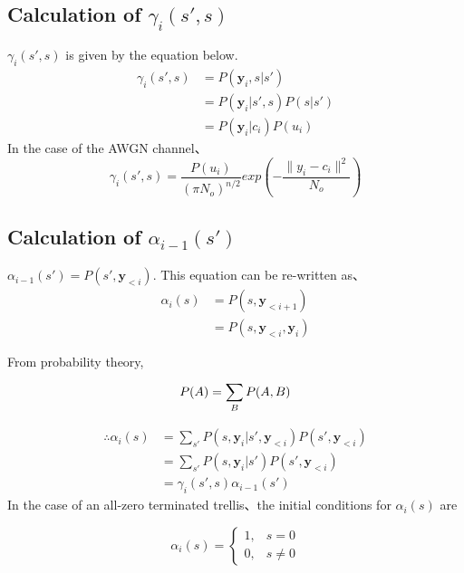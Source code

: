 \documentclass[20 pts]{article}
\begin{document}
\subsection{Calculation of $\gamma_i(s',s)$}
$\gamma_i(s',s)$ is given by the equation below.
\begin{equation}
\begin{split}
\gamma_i(s',s)&=P(\boldsymbol{y}_{i},s|s')\\
&=P(\boldsymbol{y}_{i}|s',s)P(s|s')\\
&=P(\boldsymbol{y}_{i}|c_i)P(u_i)
\end{split}
\end{equation}
In the case of the AWGN channel、
\begin{equation}
\gamma_i(s',s)=\frac{P(u_i)}{(\pi N_o)^{n/2}}exp(-\frac{\|{y_i-c_i}\|^2}{N_o})
\end{equation}
\subsection{Calculation of $\alpha_{i-1}(s')$}
$\alpha_{i-1}(s')=P(s',\boldsymbol{y}_{<i})$. This equation can be re-written as、
\begin{equation}
\begin{split}
\alpha_{i}(s)&=P(s,\boldsymbol{y}_{<i+1})\\
&=P(s,\boldsymbol{y}_{<i},\boldsymbol{y}_{i})
\end{split}
\end{equation}

From probability theory,
\begin{equation}
P(A)=\sum_{B}^{}P(A,B)\\
\end{equation}

\begin{equation}
\begin{split}
\therefore \alpha_i(s)&=\sum_{s'}^{}P(s,\boldsymbol{y}_{i}|s',\boldsymbol{y}_{<i})P(s',\boldsymbol{y}_{<i})\\
&=\sum_{s'}^{}P(s,\boldsymbol{y}_{i}|s')P(s',\boldsymbol{y}_{<i})\\
&=\gamma_i(s',s)\alpha_{i-1}(s')
\end{split}
\end{equation}
	In the case of an all-zero terminated trellis、the initial conditions for $\alpha_i(s)$ are

\[
    \alpha_i(s)= 
\begin{cases}
   1,& s= 0\\        0,              &  s\neq 0
\end{cases}
\]
\end{document}
